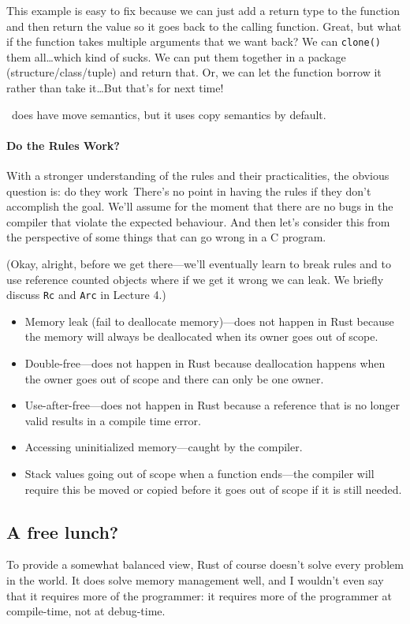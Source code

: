This example is easy to fix because we can just add a return type to the function and then return the value so it goes back to the calling function. Great, but what if the function takes multiple arguments that we want back? We can \texttt{clone()} them all\ldots which kind of sucks. We can put them together in a package (structure/class/tuple) and return that. Or, we can let the function borrow it rather than take it\ldots But that's for next time!

\CPP~does have move semantics, but it uses copy semantics by default.

\paragraph{Do the Rules Work?}
With a stronger understanding of the rules and their practicalities, the obvious question is: do they work\textinterrobang~There's no point in having the rules if they don't accomplish the goal. We'll assume for the moment that there are no bugs in the compiler that violate the expected behaviour. And then let's consider this from the perspective of some things that can go wrong in a C program.

(Okay, alright, before we get there---we'll eventually learn to break rules and to use reference counted objects where if we get it wrong we can leak. We briefly discuss \texttt{Rc} and \texttt{Arc} in Lecture 4.)

\begin{itemize}
	\item Memory leak (fail to deallocate memory)---does not happen in Rust because the memory will always be deallocated when its owner goes out of scope.
	\item Double-free---does not happen in Rust because deallocation happens when the owner goes out of scope and there can only be one owner.
	\item Use-after-free---does not happen in Rust because a reference that is no longer valid results in a compile time error.
	\item Accessing uninitialized memory---caught by the compiler.
	\item Stack values going out of scope when a function ends---the compiler will require this be moved or copied before it goes out of scope if it is still needed.
\end{itemize}

\subsection*{A free lunch?}
To provide a somewhat balanced view, Rust of course doesn't solve every problem
in the world. It does solve memory management well, and I wouldn't even say that
it requires more of the programmer: it requires more of the programmer at compile-time,
not at debug-time.

